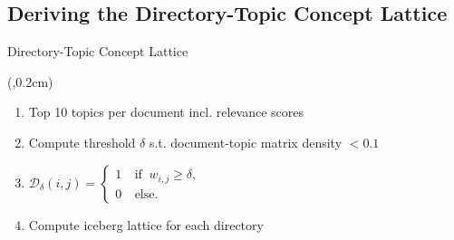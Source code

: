 \subsection{Deriving the Directory-Topic Concept Lattice}
\begin{frame}{Directory-Topic Concept Lattice}
    \begin{textblock*}{3.8cm}(\paperwidth-3.9cm,0.2cm) %
        \only<1>{
            
        }
    \end{textblock*}
    \begin{enumerate}
        \item <1,3-> Top 10 topics per document incl. relevance scores
        \item <3-> Compute threshold $\delta$ s.t. document-topic matrix density $< 0.1$
        \item <4-> $\mathcal{D}_\delta(i,j)=\left\{ \begin{array}{cl}
                        1 & \ \text{if } \ w_{i,j} \geq \delta, \\
                        0 & \ \text{else.}
                    \end{array} \right.$
        \item <5-> Compute iceberg lattice for each directory
    \end{enumerate}




\end{frame}
